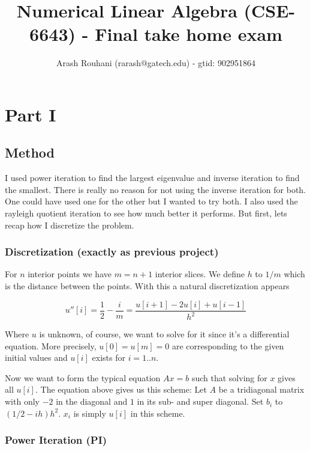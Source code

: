 \documentclass[a4paper,11pt]{article}
\title{Numerical Linear Algebra (CSE-6643) - Final take home exam}
\author{Arash Rouhani (rarash@gatech.edu) - gtid: 902951864}
\begin{document}
\maketitle

\section{Part I}


\subsection{Method}

I used power iteration to find the largest eigenvalue and inverse iteration to
find the smallest. There is really no reason for not using the inverse
iteration for both. One could have used one for the other but I wanted to try
both.  I also used the rayleigh quotient iteration to see how much better it
performs. But first, lets recap how I discretize the problem.

\subsubsection{Discretization (exactly as previous project)}

For $n$ interior points we have $m=n+1$ interior slices. We define $h$
to $1/m$ which is the distance between the points. With this a natural
discretization appears

\[
  u''[i] = \frac{1}{2} - \frac{i}{m} = \frac{u[i+1]-2u[i]+u[i-1]}{h^2}
\]

Where $u$ is unknown, of course, we want to solve for it since it's a
differential equation. More precisely, $u[0]=u[m]=0$ are corresponding
to the given initial values and $u[i]$ exists for $i = 1..n$.

Now we want to form the typical equation $Ax=b$ such that solving for
$x$ gives all $u[i]$. The equation above gives us this scheme: Let $A$
be a tridiagonal matrix with only $-2$ in the diagonal and $1$ in its
sub- and super diagonal. Set $b_i$ to $(1/2-ih)h^2$. $x_i$ is simply
$u[i]$ in this scheme.


\subsubsection{Power Iteration (PI)}
\end{document}
